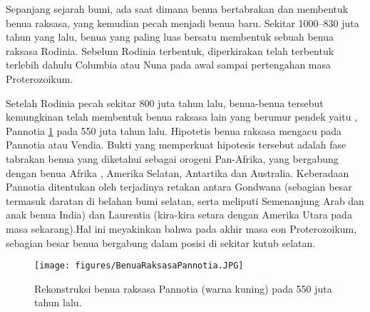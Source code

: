 Sepanjang sejarah bumi, ada saat dimana benua bertabrakan dan membentuk benua raksasa, yang kemudian pecah menjadi benua baru. Sekitar 1000–830 juta tahun yang lalu, benua yang paling luas bersatu membentuk sebuah benua raksasa Rodinia. Sebelum Rodinia terbentuk, diperkirakan telah terbentuk terlebih dahulu Columbia atau Nuna pada awal sampai pertengahan masa Proterozoikum.

Setelah Rodinia pecah sekitar 800 juta tahun lalu, benua-benua tersebut kemungkinan telah membentuk benua raksasa lain yang berumur pendek yaitu , Pannotia \ref{Benua Raksasa Pannotia} pada 550 juta tahun lalu. Hipotetis benua raksasa mengacu pada Pannotia atau Vendia. Bukti yang memperkuat hipotesis tersebut adalah fase tabrakan benua yang diketahui sebagai orogeni Pan-Afrika, yang bergabung dengan benua Afrika , Amerika Selatan, Antartika dan Australia. Keberadaan Pannotia ditentukan oleh terjadinya retakan antara Gondwana (sebagian besar termasuk daratan di belahan bumi selatan, serta meliputi Semenanjung Arab dan anak benua India) dan Laurentia (kira-kira setara dengan Amerika Utara pada masa sekarang).Hal ini meyakinkan bahwa pada akhir masa eon Proterozoikum, sebagian besar benua bergabung dalam posisi di sekitar kutub selatan.

\begin{figure}[ht]
    \centerline{\texttt{[image: figures/BenuaRaksasaPannotia.JPG]}}
    \caption{Rekonstruksi benua raksasa Pannotia (warna kuning) pada 550 juta tahun lalu.}
    \label{Benua Raksasa Pannotia}
    \end{figure}



